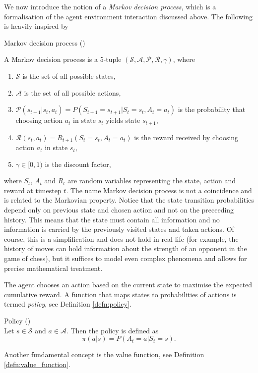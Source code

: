 We now introduce the notion of a \textit{Markov decision process}, which is a formalisation of the agent environment interaction discussed above. The following is heavily inspired by \cite[Chapter 3]{sutton2018reinforcement}
\begin{defn}{\normalfont Markov decision process} 
\label{defn:markov_decision_process}
{\normalfont (\cite[Chapter 3]{sutton2018reinforcement})}

A Markov decision process is a 5-tuple $(\mathcal{S}, \mathcal{A}, \mathcal{P}, \mathcal{R}, \gamma)$, where 
\begin{enumerate}
\item $\mathcal{S}$ is the set of all possible states,
\item $\mathcal{A}$ is the set of all possible actions,
\item $\mathcal{P}(s_{t+1}|s_{t},a_t)=P(S_{t+1}=s_{t+1}|S_t=s_{t},A_t=a_t)$ is the probability that choosing action $a_t$ in state $s_t$ yields state $s_{t+1}$,
\item $\mathcal{R}(s_t, a_t)=R_{t+1}(S_t=s_t, A_t=a_t)$ is the reward received by choosing action $a_t$ in state $s_t$,
\item $\gamma \in [0,1)$ is the discount factor,

\end{enumerate}
\end{defn}
where $S_t$, $A_t$ and $R_t$ are random variables representing the state, action and reward at timestep $t$. The name Markov decision process is not a coincidence and is related to the Markovian property. Notice that the state transition probabilities depend only on previous state and chosen action and not on the preceeding history. This means that the state must contain all information and no information is carried by the previously visited states and taken actions. Of course, this is a simplification and does not hold in real life (for example, the history of moves can hold information about the strength of an opponent in the game of chess), but it suffices to model even complex phenomena and allows for precise mathematical treatment. 

The agent chooses an action based on the current state to maximise the expected cumulative reward. A function that maps states to probabilities of actions is termed \textit{policy}, see Definition \ref{defn:policy}.

\begin{defn}{\normalfont Policy} \label{defn:policy}
{\normalfont (\cite[Section 3.5]{sutton2018reinforcement})} \\
Let $s \in \mathcal{S}$ and $a \in \mathcal{A}$. Then the policy is defined as
\begin{equation*}
\pi(a|s)=P(A_t=a|S_t=s).
\end{equation*}
\end{defn} 
Another fundamental concept is the value function, see Definition \ref{defn:value_function}.

